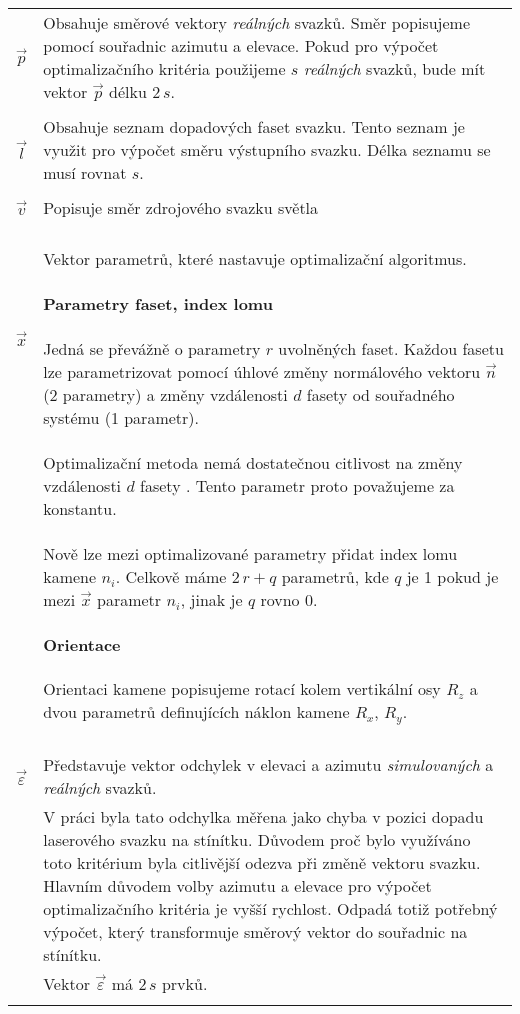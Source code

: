 \begin{tabular}{l p{12cm}}
$\vec{p}$ & Obsahuje směrové vektory \textit{reálných} svazků. Směr popisujeme pomocí souřadnic azimutu a elevace. Pokud pro výpočet optimalizačního kritéria použijeme $s$ \textit{reálných} svazků, bude mít vektor $\vec{p}$ délku $2\,s$. \\ & \\

$\vec{l}$ & Obsahuje seznam dopadových faset svazku. Tento seznam je využit pro výpočet směru výstupního svazku. Délka seznamu se musí rovnat $s$. \\ & \\

$\vec{v}$ & Popisuje směr zdrojového svazku světla\\ & \\  

$\vec{x}$ & Vektor parametrů, které nastavuje optimalizační algoritmus.
\paragraph{Parametry faset, index lomu}

 Jedná se převážně o parametry $r$ uvolněných faset. Každou fasetu lze parametrizovat pomocí úhlové změny normálového vektoru $\vec{n}$ (2 parametry) a změny vzdálenosti $d$ fasety od souřadného systému (1 parametr).\\
& Optimalizační metoda nemá dostatečnou citlivost na změny vzdálenosti $d$ fasety \cite{Bodlak2005}. Tento parametr proto považujeme za konstantu.\\
& Nově lze mezi optimalizované parametry přidat index lomu kamene $n_i$. Celkově máme $2\,r + q$ parametrů, kde $q$ je 1 pokud je mezi $\vec{x}$ parametr $n_i$, jinak je $q$ rovno 0.

\paragraph{Orientace} Orientaci kamene popisujeme rotací kolem vertikální osy $R_z$ a dvou parametrů definujících náklon kamene $R_x$, $R_y$. 
 \\ & \\

$\vec{\varepsilon}$ & Představuje vektor odchylek v elevaci a azimutu \textit{simulovaných} a \textit{reálných} svazků.\\ 
& V práci \cite{Bodlak2005} byla tato odchylka měřena jako chyba v pozici dopadu laserového svazku na stínítku. Důvodem proč bylo využíváno toto kritérium byla citlivější odezva při změně vektoru svazku. Hlavním důvodem volby azimutu a elevace pro výpočet optimalizačního kritéria je vyšší rychlost. Odpadá totiž potřebný výpočet, který transformuje směrový vektor do souřadnic na stínítku.\\ & Vektor $\vec{\varepsilon}$ má $2\,s$ prvků.\\ & \\

\end{tabular}


